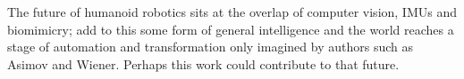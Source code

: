 The future of humanoid robotics sits at the overlap of computer vision, IMUs and biomimicry; add to this some form of general intelligence and the world reaches a stage of automation and transformation only imagined by authors such as Asimov and Wiener. Perhaps this work could contribute to that future.

































